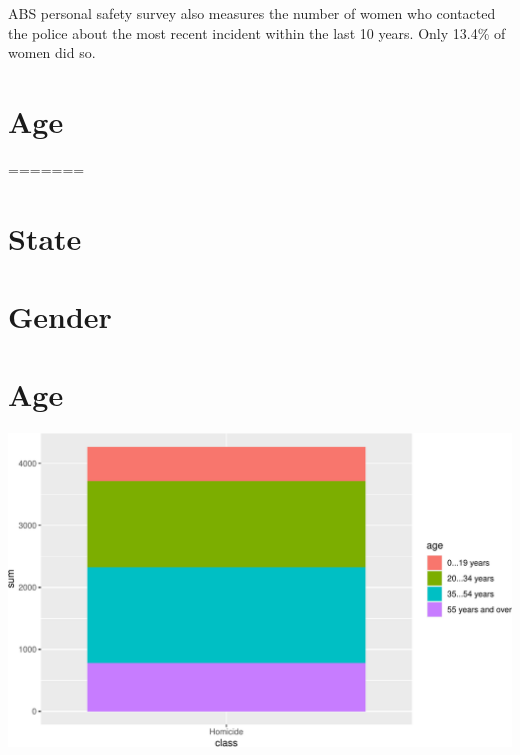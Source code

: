 \documentclass[11pt,a4paper,]{article}
\begin{document}
ABS personal safety survey also measures the number of women who contacted the police about the most recent incident within the last 10 years. Only 13.4\% of women did so.

\clearpage

\section*{Age}
=======
\section*{State}

\section*{Gender}

\section*{Age}

\begin{center}\includegraphics[width=0.5\linewidth]{report_files/figure-latex/Homicide-1} \end{center}
\end{document}
